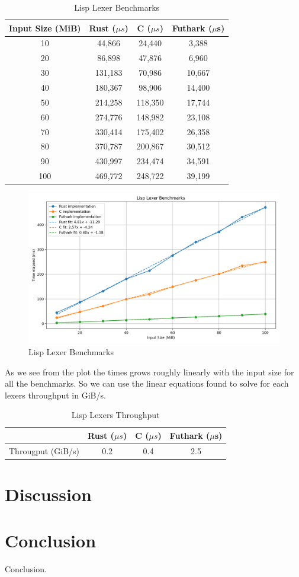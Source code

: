 \documentclass[a4paper,12pt]{article}
\theoremstyle{definition}
\begin{document}
\begin{table}[H]
  \centering
  \begin{tabular}{c|c|c|c}
    Input Size (MiB) & Rust ($\mu s$) & C ($\mu s$) & Futhark ($\mu$s) \\ \hline
    10 & 44,866 & 24,440 & 3,388 \\
    20 & 86,898 & 47,876 & 6,960 \\
    30 & 131,183 & 70,986 & 10,667 \\
    40 & 180,367 & 98,906 & 14,400 \\
    50 & 214,258 & 118,350 & 17,744 \\
    60 & 274,776 & 148,982 & 23,108 \\
    70 & 330,414 & 175,402 & 26,358 \\
    80 & 370,787 & 200,867 & 30,512 \\
    90 & 430,997 & 234,474 & 34,591 \\
    100 & 469,772 & 248,722 & 39,199
  \end{tabular}
  \caption{Lisp Lexer Benchmarks}
\end{table}

\begin{figure}[H]
  \centering
  \includegraphics[width=\linewidth]{plot.png}
  \caption{Lisp Lexer Benchmarks}
\end{figure}
\noindent As we see from the plot the times grows roughly linearly with the input size for all the benchmarks. So we can use the linear equations found to solve for each lexers throughput in GiB/s.
\begin{table}[H]
  \centering
  \begin{tabular}{c|c|c|c}
     & Rust ($\mu s$) & C ($\mu s$) & Futhark ($\mu$s) \\ \hline
    Througput (GiB/s) & 0.2 & 0.4 & 2.5 \\
  \end{tabular}
  \caption{Lisp Lexers Throughput}
\end{table}

\section{Discussion}
\section{Conclusion}
Conclusion.
\printbibliography
\end{document}

